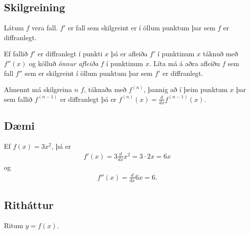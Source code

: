 \documentclass[b5paper,10pt,icelandic]{sphinxmanual}
\begin{document}
\subsection{Skilgreining}
\label{\detokenize{kafli03:skilgreining}}
Látum \(f\) vera fall.  \(f'\) er fall sem skilgreint er
í öllum punktum þar sem \(f\) er diffranlegt.

Ef fallið \(f'\) er diffranlegt í punkti \(x\) þá er afleiða
\(f'\) í punktinum \(x\) táknuð með \(f''(x)\) og kölluð
\textit{önnur afleiða} \(f\) í punktinum \(x\). Líta má á aðra afleiðu
\(f\) sem fall \(f''\) sem er skilgreint í öllum punktum þar sem
\(f'\) er diffranlegt.

Almennt má skilgreina \(n\) \(f\), táknaða með
\(f^{(n)}\), þannig að í þeim punktum \(x\) þar sem fallið
\(f^{(n-1)}\) er diffranlegt þá er
\(f^{(n)}(x)=\frac{d}{dx}f^{(n-1)}(x)\).


\subsection{Dæmi}
\label{\detokenize{kafli03:id8}}
Ef \(f(x)  = 3x^2\), þá er
\begin{equation*}
\begin{split}f'(x) = 3\frac{d}{dx}x^2 = 3\cdot 2x = 6x\end{split}
\end{equation*}
og
\begin{equation*}
\begin{split}f''(x) = \frac{d}{dx} 6x = 6.\end{split}
\end{equation*}

\subsection{Ritháttur}
\label{\detokenize{kafli03:id9}}
Ritum \(y=f(x)\).
\end{document}
